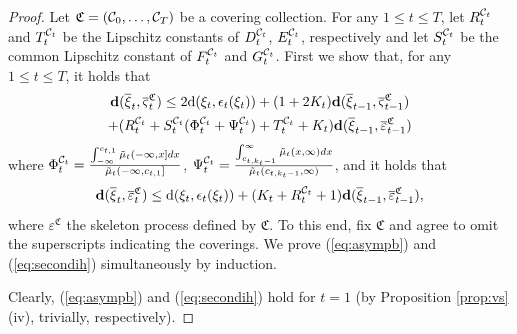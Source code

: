\documentclass{article}              %
\begin{document}
\begin{proof}
Let $\mathfrak{C}=(\mathcal{C}_{0},\dots,\mathcal{C}_{T})$ be a covering collection.
For any $1\leq t\leq T$, let $R_{t}^{\mathcal{C}_{t}}$ and $T_{t}^{\mathcal{C}_{t}}$
be the Lipschitz constants of $D_{t}^{\mathcal{C}_{t}}$, $E_{t}^{\mathcal{C}_{t}}$, respectively
and let $S_{t}^{\mathcal{C}_{t}}$ be the common Lipschitz constant of $F_{t}^{\mathcal{C}_{t}}$
and $G_{t}^{\mathcal{C}_{t}}$. First we show that, for any $1\leq t\leq T$, it holds that
\begin{multline}
\mathbf{d}(\overline{\xi}_{t},\overline{\varsigma}_{t}^{\mathfrak{C}})\leq2\mathrm{d}(\xi_{t},\epsilon_{t}(\xi_{t}))+(1+2K_{t})\mathbf{d}(\overline{\xi}_{t-1},\overline{\varsigma}_{t-1}^{\mathfrak{C}})\\
+(R_{t}^{\mathcal{C}_{t}}+S_{t}^{\mathcal{C}_{t}}(\Phi_{t}^{\mathcal{C}_{t}}+\Psi_{t}^{\mathcal{C}_{t}})+T_{t}^{\mathcal{C}_{t}}+K_{t})\mathbf{d}(\overline{\xi}_{t-1},\overline{\varepsilon}_{t-1}^{\mathfrak{C}})\label{eq:asympb}
\end{multline}
where $\Phi_{t}^{\mathcal{C}_{t}}=\frac{\int_{-\infty}^{c_{t,1}}\tilde{\mu}_{t}(-\infty,x]dx}{\tilde{\mu}_{t}(-\infty,c_{t,1}]}$,
$\Psi_{t}^{\mathcal{C}_{t}}=\frac{\int_{c_{t,k_{t}-1}}^{\infty}\tilde{\mu}_{t}(x,\infty)dx}{\tilde{\mu}_{t}(c_{t,k_{t}-1},\infty)}$,
and it holds that 
\begin{equation}
\mathbf{d}(\overline{\xi}_{t},\overline{\varepsilon}_{t}^{\mathfrak{C}})\leq\mathrm{d}(\xi_{t},\epsilon_{t}(\xi_{t}))+(K_{t}+R_{t}^{\mathcal{C}_{t}}+1)\mathbf{d}(\overline{\xi}_{t-1},\overline{\varepsilon}_{t-1}^{\mathfrak{C}}),\label{eq:secondih}
\end{equation}
where $\varepsilon^{\mathfrak{C}}$ the skeleton process defined
by $\mathfrak{C}$. To this end, fix $\mathfrak{C}$ and agree to omit the superscripts indicating
the coverings. We prove (\ref{eq:asympb}) and (\ref{eq:secondih})
simultaneously by induction. 

Clearly, (\ref{eq:asympb}) and (\ref{eq:secondih}) hold for $t=1$
(by Proposition \ref{prop:vs} (iv), trivially, respectively).


\end{proof}
\end{document}
